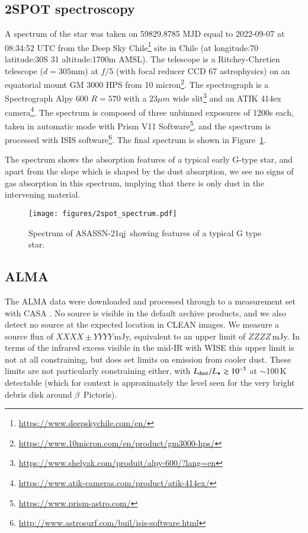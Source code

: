 \documentclass{aa}
\newcommand{\asas}{ASASSN-21qj}
\begin{document}
\subsection{2SPOT spectroscopy}

A spectrum of the star was taken on 59829.8785 MJD equal to 2022-09-07 at 08:34:52 UTC from the Deep Sky Chile\footnote{\url{https://www.deepskychile.com/en/}} site in Chile (at longitude:70
latitude:30\degr S 31 altitude:1700m AMSL).
%
The telescope is a Ritchey-Chretien telescope ($d=305$mm) at $f/5$ (with focal reducer CCD 67 astrophysics) on an equatorial mount GM 3000 HPS from 10 micron\footnote{\url{https://www.10micron.com/en/product/gm3000-hps/}}.
%
The spectrograph is a Spectrograph Alpy 600 $R=570$ with a $23\mu m$ wide slit\footnote{\url{https://www.shelyak.com/produit/alpy-600/?lang=en}} and an ATIK 414ex camera\footnote{\url{https://www.atik-cameras.com/product/atik-414ex/}}.
%
The spectrum is composed of three unbinned exposures of 1200s each, taken in automatic mode with Prism V11 Software\footnote{\url{https://www.prism-astro.com/}}, and the spectrum is processed with ISIS software\footnote{\url{http://www.astrosurf.com/buil/isis-software.html}}.
%
The final spectrum is shown in Figure~\ref{fig:2spotspectrum}.

The spectrum shows the absorption features of a typical early G-type star, and apart from the slope which is shaped by the dust absorption, we see no signs of gas absorption in this spectrum, implying that there is only dust in the intervening material.



\begin{figure}
    \begin{centering}
        \texttt{[image: figures/2spot\_spectrum.pdf]}
\caption{Spectrum of \asas\ showing features of a typical G type star.}
        \label{fig:2spotspectrum}
    \end{centering}
\end{figure}

\subsection{ALMA}

The ALMA data were downloaded and processed through to a measurement set with CASA \citep{2007ASPC..376..127M}.
%
No source is visible in the default archive products, and we also detect no source at the expected location in CLEAN images.
%
We measure a source flux of $XXXX \pm YYYY$\,mJy, equivalent to an upper limit of $ZZZZ$\,mJy.
%
In terms of the infrared excess visible in the mid-IR with WISE this upper limit is not at all constraining, but does set limits on emission from cooler dust.
%
These limits are not particularly constraining either, with $L_{\rm dust}/L_\star \gtrsim 10^{-3}$ at $\sim$100\,K detectable (which for context is approximately the level seen for the very bright debris disk around $\beta$~Pictoris).
\end{document}

